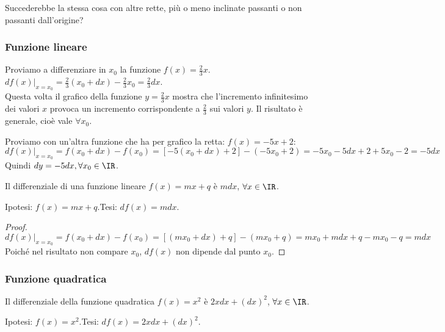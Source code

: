 Succederebbe la stessa cosa con altre rette, più o meno inclinate passanti o
non passanti dall'origine?

\subsubsection{Funzione lineare}
\label{subsec:diff01_flineare}

\begin{esempio}
 Proviamo a differenziare in $x_0$ la funzione $f(x)=\frac{2}{3}x$.\\
\( df(x)|_{x=x_0}=\frac{2}{3}(x_0+dx)-\frac{2}{3}x_0=\frac{2}{3}dx\).\\
Questa volta il grafico della funzione $y=\frac{2}{3}x$ mostra che
l'incremento infinitesimo dei valori $x$ provoca un incremento corrispondente 
a $\frac{2}{3}$ sui valori $y$. Il risultato è generale, 
cioè vale $\forall x_0$.
\end{esempio}

\begin{esempio}
Proviamo con un'altra funzione che ha per grafico la retta: \(f(x) = -5x+2\):
\[
df(x)|_{x=x_0} = 
f(x_0+dx)-f(x_0)=[-5(x_0+dx)+2]-(-5x_0+2)=-5x_0-5dx+2+5x_0-2=-5dx
\]
Quindi $dy=-5dx, \forall x_0 \in \IR$. 
\end{esempio}

\begin{teorema}
 Il differenziale di una funzione lineare $f(x)=mx+q$ è $mdx$, 
 $\forall x\in \IR$.
\end{teorema}

\noindent Ipotesi: \(f(x)=mx+q\).\tab Tesi: \(df(x)=mdx\).

\begin{proof}
\[
 df(x)|_{x=x_0}= f(x_0+dx)-f(x_0)=[(mx_0+dx)+q]-(mx_0+q)=mx_0+mdx+q-mx_0-q=mdx
\]
Poiché nel risultato non compare $x_0$, $df(x)$ non dipende dal punto $x_0$.
\end{proof}

\subsubsection{Funzione quadratica}
\label{subsubsec:diff01_diffquad}

\begin{teorema}
 Il differenziale della funzione quadratica $f(x)=x^2$ è $2xdx+(dx)^2$, 
$\forall x\in \IR$.
\end{teorema}

\noindent Ipotesi: \(f(x)=x^2\).\tab Tesi: \(df(x)=2xdx+(dx)^2\).

